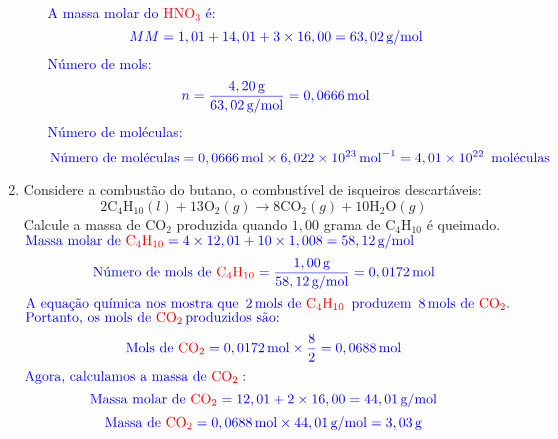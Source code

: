 \documentclass[a4paper, 12pt]{article}
\begin{document}
\begin{enumerate}
\begin{enumerate}[align=left, labelsep=-0.5em]
                    \\[10pt]
                    \textcolor{blue}{A massa molar do \textcolor{red}{\(\text{HNO}_{3}\)} é:}
                    \[
                        \textcolor{blue}{\text{$MM$} = 1,01 + 14,01 + 3 \times 16,00 = 63,02 \, \text{g/mol}}
                    \]
                    \textcolor{blue}{Número de mols:}
                    \[
                        \textcolor{blue}{n = \frac{4,20 \, \text{g}}{63,02 \, \text{g/mol}} = 0,0666 \, \text{mol}}
                    \]
                    \textcolor{blue}{Número de moléculas:}
                    \[
                        \textcolor{blue}{\text{Número de moléculas} = 0,0666 \, \text{mol} \times 6,022 \times 10^{23} \, \text{mol}^{-1} = 4,01 \times 10^{22} \, \text{ moléculas}}
                    \]
          \end{enumerate}


    \item Considere a combustão do butano, o combustível de isqueiros
          descartáveis:
          \[
              2\text{C}_{4}\text{H}_{10}(l) + 13\text{O}_{2}(g) \rightarrow 8\text{CO}_{2}
              (g) + 10\text{H}_{2}\text{O}(g)
          \]
          Calcule a massa de $\text{CO}_{2}$ produzida quando $1,00$ grama de $\text{C}
              _{4}\text{H}_{10}$ é queimado.
          \\[10pt]
          $\textcolor{blue}{\text{Massa molar de \textcolor{red}{\(\text{C}_4\text{H}_{10}\)}} = 4 \times 12,01 + 10 \times 1,008 = 58,12 \, \text{g/mol}}$
          \[
              \textcolor{blue}{\text{Número de mols de \textcolor{red}{\(\text{C}_4\text{H}_{10}\)}} = \frac{1,00 \, \text{g}}{58,12 \, \text{g/mol}} = 0,0172 \, \text{mol}}
          \]
          $\textcolor{blue}{\text{A equação química nos mostra que } \, 2 \, \text{mols de \textcolor{red}{\(\text{C}_4\text{H}_{10}\)}} \, \text{ produzem } \, 8 \, \text{mols de \textcolor{red}{\(\text{CO}_2\)}}.}$
          \\[10pt]
          $\textcolor{blue}{\text{Portanto, os mols de \textcolor{red}{\(\text{CO}_2\)}} \, \text{produzidos são:}}$
          \[
              \textcolor{blue}{\text{Mols de \textcolor{red}{\(\text{CO}_2\)}} = 0,0172 \, \text{mol} \times \frac{8}{2} = 0,0688 \, \text{mol}}
          \]
          $\textcolor{blue}{\text{Agora, calculamos a massa de \textcolor{red}{\(\text{CO}_2\)}}:}$
          \[
              \textcolor{blue}{\text{Massa molar de \textcolor{red}{\(\text{CO}_2\)}} = 12,01 + 2 \times 16,00 = 44,01 \, \text{g/mol}}
          \]
          \[
              \textcolor{blue}{\text{Massa de \textcolor{red}{\(\text{CO}_2\)}} = 0,0688 \, \text{mol} \times 44,01 \, \text{g/mol} = 3,03 \, \text{g}}
          \]




\end{enumerate}
\end{document}
